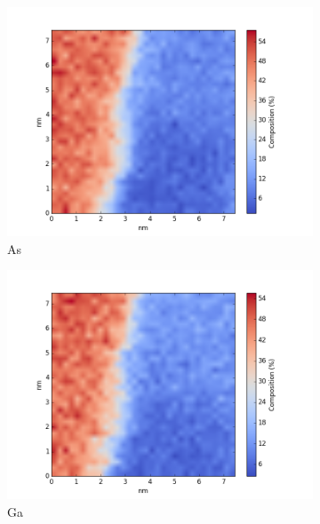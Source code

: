 \begin{figure}
	\centering
	\begin{subfigure}{0.5\textwidth}
		\includegraphics[width=\textwidth]{fig/q/E_heatedGeKline/As_zetaAbs}
		\caption{As}
		\label{fig:Eas}
	\end{subfigure}%
	\hfill
	\begin{subfigure}{0.5\textwidth}
		\includegraphics[width=\textwidth]{fig/q/E_heatedGeKline/Ga_zetaAbs}
		\caption{Ga}
		\label{fig:Ega}
	\end{subfigure}
	\centering
	\begin{subfigure}{0.5\textwidth}

\end{subfigure}
\end{figure}
